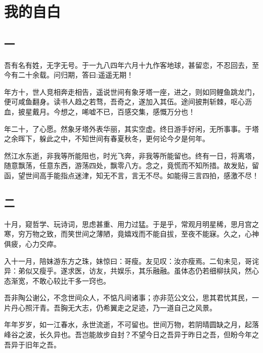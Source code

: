 \chapter{我的自白}
\section*{一}

吾有名有姓，无字无号。于一九八四年六月十九作客地球，甚留恋，不忍回去，至今有二十余载。问归期，答曰:遥遥无期！

年方十，世人竞相奔走相告，遥说世间有象牙塔一座，进之，则如同鲤鱼跳龙门，便可咸鱼翻身。读书人趋之若骛，吾奇之，遂加入其伍。途间披荆斩棘，呕心沥血，披星戴月。今想之，唏嘘不已，百感交集，感慨万分也！

年二十，了心愿。然象牙塔外表华丽，其实空虚。终日游手好闲，无所事事。于塔之余晖下，躲此之中，不知世间有春夏秋冬，更何论今夕是何年。

然江水东逝，非我等所能阻也，时光飞奔，非我等所能留也。终有一日，将离塔，随意飘荡，任意东西，游荡四处，飘零八方。念之，竟慌而不知所措。故发贴，留函，望世间高手能指点迷津，知无不言，言无不尽。如能得三言四拍，感激不尽！

\newpage
\section*{二}

十月，窥哲学、玩诗词，思虑甚重、用力过猛。于是乎，常观月明星稀，思月宫之寒，穷万物之致，而笑世间之薄陋，竟嬉戏而不能自拔，至夜不能寐。久之，心神俱疲，心力交瘁。

入十一月，陪妹游东方之珠，妹惊曰：哥瘦。友见叹：汝亦瘦焉。二旬未见，哥诧异：弟似又瘦乎。遂求医，访友，共娱乐，其乐融融。虽体态仍若细柳扶风，然心态渐宽，不敢心较比干多一窍也。

吾非陶公谢公，不念世间众人，不惦凡间诸事；亦非范公文公，思其君忧其民，一片丹心照汗青。吾胸无大志，仍希翼走之足迹，乃一道自己之风景。

年年岁岁，如一江春水，永世流逝，不可留也。世间万物，若阴晴圆缺之月，起落峰谷之波，长久异也。吾岂能故步自封？不望今日之吾异于昨日之吾，但盼今年之吾异于旧年之吾。
